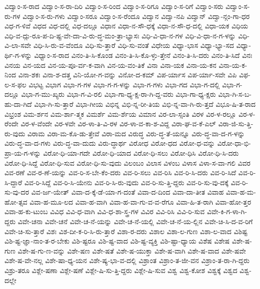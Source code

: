 {ವಿದ್ವಾಂ-ಸ-ರಾದ
ವಿದ್ವಾಂ-ಸ-ರಾ-ದಿರಿ
ವಿದ್ವಾಂ-ಸ-ರಿಂದ
ವಿದ್ವಾಂ-ಸ-ರಿಗೂ
ವಿದ್ವಾಂ-ಸ-ರಿಗೆ
ವಿದ್ವಾಂ-ಸರು
ವಿದ್ವಾಂ-ಸ-ರು-ಗಳ
ವಿದ್ವಾಂ-ಸ-ರು-ಗಳು
ವಿದ್ವಾಂ-ಸರೂ
ವಿದ್ವಾಂ-ಸ-ರೆಂದೂ
ವಿದ್ವಾನ
ವಿದ್ವಾ-ನಪಿ
ವಿದ್ವಾನ್
ವಿದ್ವಾ-ನ್ಗಂ-ಗಾ-ಧರ
ವಿಧ-ಗ-ಳಿವೆ
ವಿಧದ
ವಿಧ-ದಲ್ಲಿ
ವಿಧ-ದಲ್ಲೂ
ವಿಧಾನ
ವಿಧಾ-ನ-ಸೌ-ಧಕ್ಕೆ
ವಿಧಾ-ನ-ಸೌ-ಧ-ದಲ್ಲಿ
ವಿಧಾ-ಯಕ
ವಿಧಿಯ
ವಿಧಿ-ವ-ದ್ಗು-ರೂ-ಪ-ದಿ-ಷ್ಟ-ವೇ-ದಾ-ವಿ-ರು-ದ್ಧ-ಮಂ-ತ್ರಾ-ಭ್ಯಾಸಃ
ವಿಧಿ-ವಿ-ಧಾ-ನ-ಗಳ
ವಿಧಿ-ವಿ-ಧಾ-ನ-ಗ-ಳನ್ನು
ವಿಧಿ-ವಿ-ಲಾ-ಸವೇ
ವಿಧಿ-ಸಿ-ರು-ವ-ವೆಂದೂ
ವಿಧಿ-ಸು-ತ್ತಾರೆ
ವಿಧಿ-ಸು-ವಂತೆ
ವಿಧೇಯ
ವಿಧ್ಯಾ-ಭಾಸ
ವಿಧ್ಯಾ-ಭ್ಯಾ-ಸದ
ವಿಧ್ಯಾ-ರ್ಥಿ-ಗ-ಳನ್ನು
ವಿಧ್ವಾಂ-ಸ-ರಾದ
ವಿನಂ-ತಿ-ಸಿ-ಕೊಂಡ
ವಿನಂ-ತಿ-ಸಿ-ಕೊ-ಳ್ಳು-ತ್ತೇನೆ
ವಿನಂ-ತಿ-ಸಿ-ದರು
ವಿನಂ-ತಿ-ಸಿದೆ
ವಿನಃ
ವಿನಯ
ವಿನ-ಯದ
ವಿನ-ಯ-ಪೂ-ರ್ವ-ಕ-ವಾಗಿ
ವಿನ-ಯ-ವಂ-ತಿಕೆ
ವಿನಾ
ವಿನಾ-ಯಕ
ವಿನಾ-ಯ-ಕನ
ವಿನಾ-ಯ-ಕ-ನಿಂದ
ವಿನಾ-ಶಕಃ
ವಿನಾ-ಶ-ದತ್ತ
ವಿನಿ-ಯೋ-ಗ-ವನ್ನು
ವಿನೋ-ದ-ಕಮ್
ವಿಪ-ರ್ಯಾಸ
ವಿಪ-ರ್ಯಾ-ಸವೇ
ವಿಪಿ
ವಿಫ-ಲ-ಸ-ಫಲ
ವಿಭಟ್ಟ
ವಿಭಾಗ
ವಿಭಾ-ಗ-ಗಳ
ವಿಭಾ-ಗ-ಗ-ಳನ್ನು
ವಿಭಾ-ಗ-ಗಳು
ವಿಭಾ-ಗದ
ವಿಭಾ-ಗ-ದಲ್ಲಿ
ವಿಭಾ-ಗ-ದಲ್ಲೂ
ವಿಭಾ-ಗ-ಮು-ಖ್ಯರು
ವಿಭಾ-ಗ-ವಿ-ರಲಿ
ವಿಭಾ-ಗಾ-ಧ್ಯ-ಕ್ಷ-ರಾ-ಗಿ-ದ್ದ-ವರು
ವಿಭಾ-ಗಾ-ಧ್ಯ-ಕ್ಷರು
ವಿಭಾ-ಗಿ-ಸ-ಬ-ಹು-ದಾ-ಗಿದೆ
ವಿಭಾ-ಗಿ-ಸು-ತ್ತಾರೆ
ವಿಭಾ-ಗೀಯ
ವಿಭಿನ್ನ
ವಿಭಿ-ನ್ನ-ರೀ-ತಿಯ
ವಿಭಿ-ನ್ನ-ವಾ-ಗಿ-ರು-ತ್ತದೆ
ವಿಭೂ-ಷಿ-ತ-ರಾದ
ವಿಭ್ರಂಶ
ವಿಮ-ರ್ಶನ
ವಿಮ-ರ್ಶಾ-ತ್ಮಕ
ವಿಮರ್ಶೆ
ವಿಮ-ರ್ಶೆಯ
ವಿಮಾನ
ವಿರ-ಲಾ-ಸ್ಸಂತಿ
ವಿರಳ
ವಿರ-ಳ-ರಲ್ಲೂ
ವಿರ-ಳ-ರೆಂದೇ
ವಿರ-ಳ-ವೆಂದೇ
ವಿರ-ಳವೇ
ವಿರ-ಳಾ-ತಿ-ವಿ-ರಳ
ವಿರ-ಳಾ-ವ-ಕಾ-ಶ-ವಿದ್ದ
ವಿರಾ-ಘ-ವ-ಕೆ-ಎಲ್
ವಿರಾ-ಜಿ-ಸು-ತ್ತಿ-ರು-ವುದು
ವಿರಾಮ
ವಿರಾ-ಮ-ಕೊ-ಡು-ತ್ತೇವೆ
ವಿರಾ-ಮದ
ವಿರುದ್ಧ
ವಿರು-ದ್ಧ-ತೆ-ಯನ್ನೂ
ವಿರು-ದ್ಧ-ವಾ-ದ-ಗ-ಳನ್ನು
ವಿರು-ದ್ಧ-ವಾ-ದ-ಗಳು
ವಿರು-ದ್ಧ-ವಾ-ದುದು
ವಿರು-ದ್ಧಾರ್ಥ
ವಿರೋಧ
ವಿರೋ-ಧದ
ವಿರೋ-ಧ-ವನ್ನು
ವಿರೋ-ಧಾ-ಭಿ-ಪ್ರಾ-ಯ-ಗ-ಳನ್ನು
ವಿರೋ-ಧಿ-ಯಾ-ಗದೇ
ವಿರೋ-ಧಿ-ಯಾದ
ವಿರೋ-ಧಿ-ಸಲು
ವಿರೋ-ಧಿಸಿ
ವಿರೋ-ಧಿ-ಸಿ-ದರು
ವಿರೋ-ಧಿ-ಸಿದ್ದೆ
ವಿರೋ-ಧಿ-ಸುವ
ವಿರೋ-ಧಿ-ಸು-ವುದು
ವಿಲಂಬಂ
ವಿಲಾಸ
ವಿಳಂಬ
ವಿಳಾಸ
ವಿಳಾ-ಸ-ವಾ-ಗಲಿ
ವಿವರ
ವಿವ-ರಣೆ
ವಿವ-ರ-ಣೆ-ಯನ್ನು
ವಿವ-ರಿ-ಸ-ಬೇ-ಕೆಂ-ದರು
ವಿವ-ರಿ-ಸಲು
ವಿವ-ರಿಸಿ
ವಿವ-ರಿ-ಸಿ-ದರು
ವಿವ-ರಿ-ಸಿದೆ
ವಿವ-ರಿ-ಸಿ-ದ್ದಾರೆ
ವಿವ-ರಿ-ಸಿದ್ದೆ
ವಿವ-ರಿ-ಸಿ-ಯೇನು
ವಿವ-ರಿ-ಸಿ-ರು-ವುದು
ವಿವ-ರಿ-ಸು-ತ್ತಿ-ದ್ದರು
ವಿವ-ರಿ-ಸು-ವು-ದಕ್ಕೆ
ವಿವ-ರಿ-ಸು-ವು-ದರ
ವಿವ-ರ್ಜ-ಯೇತ್
ವಿವಾ-ದ-ಕ್ಕೆ-ಡೆ-ಯಾ-ಗ-ದಂತೆ
ವಿವಾ-ದ-ದಿಂದ
ವಿವಾ-ದಾ-ತೀತ
ವಿವಾಹ
ವಿವಾ-ಹ-ಮ-ಹೋ-ತ್ಸವ
ವಿವಾ-ಹ-ಮೂ-ಲದ
ವಿವಾ-ಹ-ವಾಗಿ
ವಿವಾ-ಹ-ವಾ-ಗು-ವ-ವ-ರೆಗೂ
ವಿವಾ-ಹಿ-ತ-ರಾಗಿ
ವಿವಾ-ಹೋ-ತ್ತರ
ವಿವಾ-ಹ-ಕು-ಟುಂಬ
ವಿವಿಧ
ವಿವಿ-ಧ-ವಾಗಿ
ವಿವಿ-ಧ-ಶಾ-ಸ್ತ್ರ-ಗಳ
ವಿವಿರ
ವಿವಿ-ರಿಸಿ
ವಿವಿ-ರಿ-ಸುವ
ವಿವೇ-ಕಿ-ಗ-ಳಾ-ಗಿ-ದ್ದರು
ವಿವೇ-ಚನಾ
ವಿವೇ-ಚನೆ
ವಿವೇ-ಚ-ನೆ-ಯನ್ನು
ವಿವೇ-ಚ-ನೆ-ಯಲ್ಲಿ
ವಿವೇ-ಚ-ನೆ-ಯ-ಲ್ಲಿನ
ವಿವೇ-ಚಿ-ಸಿ-ದ-ವ-ರಿಗೆ
ವಿವೇ-ಚಿ-ಸು-ತ್ತಾರೆ
ವಿಶಃ
ವಿಶ-ದೀ-ಕ-ರಿ-ಸಿ-ರು-ತ್ತಾರೆ
ವಿಶಾ-ರ-ದರು
ವಿಶಾಲ
ವಿಶಾ-ಲ-ಗುಣ
ವಿಶಾ-ಲ-ವಾದ
ವಿಶಿಷ್ಟ
ವಿಶಿ-ಷ್ಟ-ಜ್ಞಾ-ನಾಂ-ತ-ರ-ಬೇಕು
ವಿಶಿ-ಷ್ಟರೂ
ವಿಶಿ-ಷ್ಟ-ವಾದ
ವಿಶಿ-ಷ್ಟ-ವ್ಯಕ್ತಿ
ವಿಶಿ-ಷ್ಟಾ-ಧ್ಯಾಯ
ವಿಶೆಷ
ವಿಶೇಷ
ವಿಶೇ-ಷ-ಗುಣ
ವಿಶೇ-ಷ-ಗು-ಣ-ವನ್ನು
ವಿಶೇ-ಷಣ
ವಿಶೇ-ಷತೆ
ವಿಶೇ-ಷ-ಯುಕ್ತಾ
ವಿಶೇ-ಷ-ವಾಗಿ
ವಿಶೇ-ಷ-ವಾದ
ವಿಶೇ-ಷವೇ
ವಿಶೇ-ಷ-ವೇ-ನಲ್ಲ
ವಿಶೇ-ಷಾ-ಧ್ಯ-ಯನ
ವಿಶೇ-ಷ್ಯ-ಭಾ-ವ-ದಲ್ಲಿ
ವಿಶ್ರಾಂತ
ವಿಶ್ರಾಂ-ತ-ಜೀ-ವನ
ವಿಶ್ರಾಂ-ತ-ರಾ-ಗಿ-ದ್ದರು
ವಿಶ್ರು-ತರೂ
ವಿಶ್ಲೇ-ಷಣಾ
ವಿಶ್ಲೇ-ಷಣೆ
ವಿಶ್ಲೇ-ಷಿ-ಸು-ತ್ತಿ-ದ್ದರು
ವಿಶ್ಲೇ-ಷಿ-ಸುವ
ವಿಶ್ವ
ವಿಶ್ವ-ಕೋಶ
ವಿಶ್ವಕ್ಕೆ
ವಿಶ್ವದ
ವಿಶ್ವ-ದಲ್ಲೇ
}
